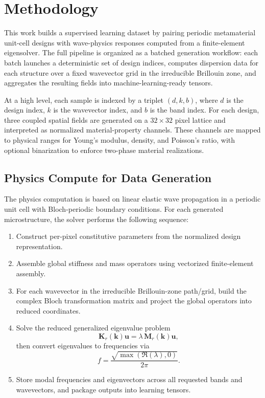 \section{Methodology}
\label{sec:methodology}

This work builds a supervised learning dataset by pairing periodic metamaterial unit-cell designs with wave-physics responses computed from a finite-element eigensolver. The full pipeline is organized as a batched generation workflow: each batch launches a deterministic set of design indices, computes dispersion data for each structure over a fixed wavevector grid in the irreducible Brillouin zone, and aggregates the resulting fields into machine-learning-ready tensors.

At a high level, each sample is indexed by a triplet $(d,k,b)$, where $d$ is the design index, $k$ is the wavevector index, and $b$ is the band index. For each design, three coupled spatial fields are generated on a $32\times 32$ pixel lattice and interpreted as normalized material-property channels. These channels are mapped to physical ranges for Young's modulus, density, and Poisson's ratio, with optional binarization to enforce two-phase material realizations.

\subsection{Physics Compute for Data Generation}
\label{subsec:physics_compute}

The physics computation is based on linear elastic wave propagation in a periodic unit cell with Bloch-periodic boundary conditions. For each generated microstructure, the solver performs the following sequence:
\begin{enumerate}
    \item Construct per-pixel constitutive parameters from the normalized design representation.
    \item Assemble global stiffness and mass operators using vectorized finite-element assembly.
    \item For each wavevector in the irreducible Brillouin-zone path/grid, build the complex Bloch transformation matrix and project the global operators into reduced coordinates.
    \item Solve the reduced generalized eigenvalue problem
    \begin{equation}
        \mathbf{K}_r(\mathbf{k})\mathbf{u} = \lambda\,\mathbf{M}_r(\mathbf{k})\mathbf{u},
    \end{equation}
    then convert eigenvalues to frequencies via
    \begin{equation}
        f = \frac{\sqrt{\max(\Re(\lambda),0)}}{2\pi}.
    \end{equation}
    \item Store modal frequencies and eigenvectors across all requested bands and wavevectors, and package outputs into learning tensors.
\end{enumerate}

